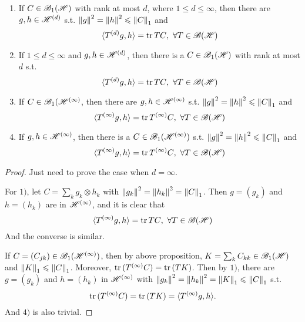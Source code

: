 \documentclass[a4paper,11pt]{report}
\begin{document}
\begin{thm}
	\begin{enumerate}[label = \arabic*)]
		\item If $C \in \mathscr{B}_{1}\mathscr{(H)}$ with rank at most $d$, where $1 \leqslant d \leqslant \infty$, then there are $g,h \in \mathscr{H}^{(d)}$ s.t. $\left\lVert g\right\lVert^2 = \left\lVert h\right\lVert^2 \leqslant \left\lVert C\right\lVert_1$ and 
		\begin{equation*}
			\langle T^{(d)}g,h \rangle = \operatorname{tr}{TC},~ \forall T \in \mathscr{B(H)}
		\end{equation*}
		\item If $1 \leqslant d \leqslant \infty$ and $g,h \in \mathscr{H}^{(d)}$, then there is a $C \in \mathscr{B}_{1}\mathscr{(H)}$ with rank at most $d$ s.t.
		\begin{equation*}
			\langle T^{(d)}g,h \rangle = \operatorname{tr}{TC},~ \forall T \in \mathscr{B(H)}
		\end{equation*}
		\item If $C \in \mathscr{B}_1(\mathscr{H}^{(\infty)}$, then there are $g,h \in \mathscr{H}^{(\infty)}$ s.t. $\left\lVert g\right\lVert^2 = \left\lVert h\right\lVert^2 \leqslant \left\lVert C\right\lVert_1$ and
		\begin{equation*}
			\langle T^{(\infty)}g,h \rangle = \operatorname{tr}{T^{(\infty)}C},~ \forall T \in \mathscr{B(H)}
		\end{equation*}
		\item If $g,h \in \mathscr{H}^{(\infty)}$, then there is a $C \in \mathscr{B}_1(\mathscr{H}^{(\infty)})$ s.t. $\left\lVert g\right\lVert^2 = \left\lVert h\right\lVert^2 \leqslant \left\lVert C\right\lVert_1$ and
		\begin{equation*}
			\langle T^{(\infty)}g,h \rangle = \operatorname{tr}{T^{(\infty)}C},~ \forall T \in \mathscr{B(H)}
		\end{equation*}
	\end{enumerate}
\end{thm}
\begin{proof}
	Just need to prove the case when $d = \infty$.
	\item For $1)$, let $C = \sum_k g_k \otimes h_k$ with $\left\lVert g_k\right\lVert^2 = \left\lVert h_k\right\lVert^2 = \left\lVert C\right\lVert_1$. Then $g = (g_k)$ and $h = (h_k)$ are in $\mathscr{H}^{(\infty)}$, and it is clear that 
	\begin{equation*}
		\langle T^{(\infty)}g,h \rangle = \operatorname{tr}{TC},~ \forall T \in \mathscr{B(H)}
	\end{equation*}
	And the converse is similar.
	\item If $C = (C_{jk}) \in \mathscr{B}_1(\mathscr{H}^{(\infty)})$, then by above proposition, $K = \sum_k C_{kk} \in \mathscr{B}_{1}\mathscr{(H)}$ and $\left\lVert K\right\lVert_1 \leqslant \left\lVert C\right\lVert_1$. Moreover, $\operatorname{tr}{(T^{(\infty)}C)} = \operatorname{tr}{(TK)}$. Then by $1)$, there are $g = (g_k)$ and $h = (h_k)$ in $\mathscr{H}^{(\infty)}$ with $\left\lVert g_k\right\lVert^2 = \left\lVert h_k\right\lVert^2 = \left\lVert K\right\lVert_1 \leqslant \left\lVert C\right\lVert_1$ s.t.
	\begin{equation*}
		\operatorname{tr}{(T^{(\infty)}C)} = \operatorname{tr}{(TK)} = \langle T^{(\infty)}g,h \rangle.
	\end{equation*}
	And $4)$ is also trivial.
\end{proof}
\end{document}
